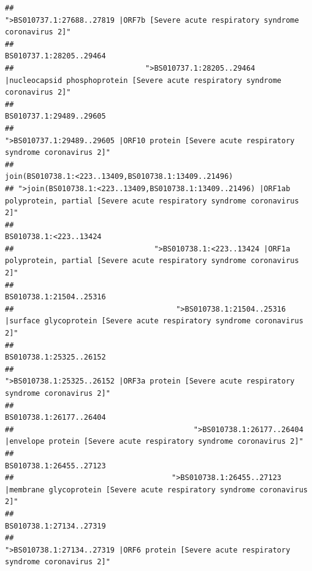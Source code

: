 \documentclass[
]{article}
\begin{document}
\begin{verbatim}
##                                                    ">BS010737.1:27688..27819 |ORF7b [Severe acute respiratory syndrome coronavirus 2]" 
##                                                                                                                BS010737.1:28205..29464 
##                              ">BS010737.1:28205..29464 |nucleocapsid phosphoprotein [Severe acute respiratory syndrome coronavirus 2]" 
##                                                                                                                BS010737.1:29489..29605 
##                                            ">BS010737.1:29489..29605 |ORF10 protein [Severe acute respiratory syndrome coronavirus 2]" 
##                                                                                   join(BS010738.1:<223..13409,BS010738.1:13409..21496) 
## ">join(BS010738.1:<223..13409,BS010738.1:13409..21496) |ORF1ab polyprotein, partial [Severe acute respiratory syndrome coronavirus 2]" 
##                                                                                                                 BS010738.1:<223..13424 
##                                ">BS010738.1:<223..13424 |ORF1a polyprotein, partial [Severe acute respiratory syndrome coronavirus 2]" 
##                                                                                                                BS010738.1:21504..25316 
##                                     ">BS010738.1:21504..25316 |surface glycoprotein [Severe acute respiratory syndrome coronavirus 2]" 
##                                                                                                                BS010738.1:25325..26152 
##                                            ">BS010738.1:25325..26152 |ORF3a protein [Severe acute respiratory syndrome coronavirus 2]" 
##                                                                                                                BS010738.1:26177..26404 
##                                         ">BS010738.1:26177..26404 |envelope protein [Severe acute respiratory syndrome coronavirus 2]" 
##                                                                                                                BS010738.1:26455..27123 
##                                    ">BS010738.1:26455..27123 |membrane glycoprotein [Severe acute respiratory syndrome coronavirus 2]" 
##                                                                                                                BS010738.1:27134..27319 
##                                             ">BS010738.1:27134..27319 |ORF6 protein [Severe acute respiratory syndrome coronavirus 2]" 

\end{verbatim}
\end{document}
